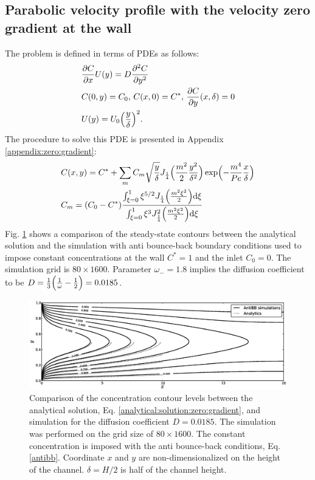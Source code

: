 \documentclass{article}
\newcommand{\beq}{\begin{equation}}
\newcommand{\feq}{\end{equation}}
\newcommand{\cstar}{C^{*}}
\newcommand{\omegaminus}{\omega_{-}}
\begin{document}
\subsection{Parabolic velocity profile with the velocity zero gradient at the wall}
The problem is defined in terms of PDEs as follows: 
\beq
\begin{aligned}
&\frac{\partial C}{\partial x} U(y)=D\frac{\partial^2 C}{\partial y^2}\\
&C(0,y)=C_0,\, C(x,0)=\cstar,\, \frac{\partial C}{\partial y }(x,\delta)=0\\
&U(y)=U_0 \Bigl(\frac{y}{\delta}\Bigr)^2.
\end{aligned}
\feq
The procedure to solve this PDE is presented in Appendix \ref{appendix:zero:gradient}:
\beq
\label{analytical:solution:zero:gradient}
\begin{aligned}
&C(x,y)=\cstar+\sum_{m}{C_m
\sqrt{\frac{y}{\delta}}J_{\frac{1}{4}}\Bigl(\frac{m^2}{2}\frac{y^2}{\delta^2}\Bigr)\exp\Bigl(-\frac{
m^4 } { Pe }
\frac { x }{\delta}\Bigr)}\\
&C_m = (C_0-\cstar) \frac{\int_{\xi=0}^{1}{\xi^{5/2} J_{\frac{1}{4}}\Bigl(\frac{m^2
\xi^2}{2}\Bigr)\mathrm{d}\xi}}{\int_{\xi=0}^{1}{\xi^3 J_{\frac{1}{4}}^2\Bigl(\frac{m^2
\xi^2}{2}\Bigr)\mathrm{d}\xi}}
\end{aligned}
\feq
Fig. \ref{fig:parabolic:zero:gradient} shows a comparison of the steady-state contours between the
analytical solution and the simulation with anti bounce-back boundary conditions used to impose constant
concentrations at the wall $\cstar=1$ and the inlet $C_0=0$. The simulation grid is
$80\times1600$. Parameter $\omegaminus=1.8$ implies the diffusion coefficient to be
$D=\frac{1}{3}\Bigl(\frac{1}{\omega}-\frac{1}{2}\Bigr)=0.0185$.  
\begin{figure}[htb!]
\includegraphics[width=\textwidth]{Figures/parabolic_profile_zero_gradient_comparison.eps}
\caption{Comparison of the concentration contour levels between the analytical solution, Eq.
\ref{analytical:solution:zero:gradient}, and simulation for the diffusion coefficient $D=0.0185$. The simulation was
performed on the grid size of $80\times 1600$. The constant concentration is imposed with the
anti bounce-back conditions, Eq. \ref{antibb}. Coordinate $x$ and $y$ are non-dimensionalized on
the height of the channel. $\delta=H/2$ is half of the channel height.
\label{fig:parabolic:zero:gradient}}
\end{figure}
 
\end{document}
